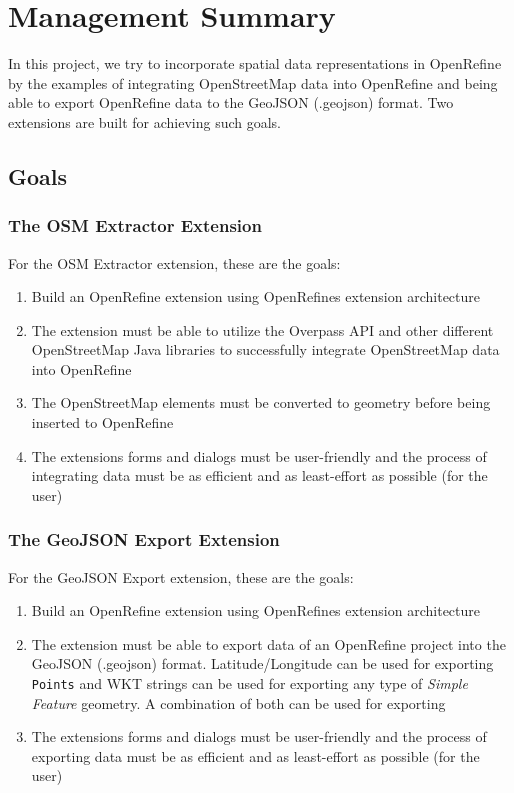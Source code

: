 \chapter*{Management Summary}
In this project, we try to incorporate spatial data representations in OpenRefine by the examples of integrating
OpenStreetMap data into OpenRefine and being able to export OpenRefine data to the GeoJSON (.geojson) format.
Two extensions are built for achieving such goals.
\section*{Goals}
\subsection*{The OSM Extractor Extension}
For the OSM Extractor extension, these are the goals:
\begin{enumerate}
    \item Build an OpenRefine extension using OpenRefine\textquotesingle s extension architecture
    \item The extension must be able to utilize the Overpass API and other different OpenStreetMap Java libraries to successfully
    integrate OpenStreetMap data into OpenRefine
    \item The OpenStreetMap elements must be converted to  geometry before being inserted to OpenRefine
    \item The extension\textquotesingle s forms and dialogs must be user-friendly and the process of integrating data must be as efficient
    and as least-effort as possible (for the user)
\end{enumerate}
\subsection*{The GeoJSON Export Extension}
For the GeoJSON Export extension, these are the goals:
\begin{enumerate}
    \item Build an OpenRefine extension using OpenRefine\textquotesingle s extension architecture
    \item The extension must be able to export data of an OpenRefine project into the GeoJSON (.geojson) format. Latitude/Longitude
    can be used for exporting \texttt{Points} and WKT strings can be used for exporting any type of \textit{Simple Feature} geometry.
    A combination of both can be used for exporting
    \item The extension\textquotesingle s forms and dialogs must be user-friendly and the process of exporting data must be as efficient
    and as least-effort as possible (for the user)
\end{enumerate}
\pagebreak
